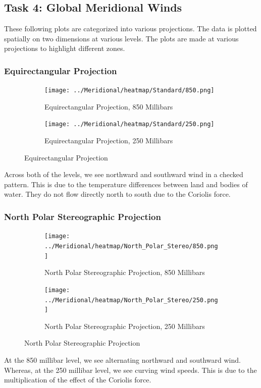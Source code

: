 \documentclass[hidelinks]{article}
\begin{document}
\subsection{Task 4: Global Meridional Winds}
These following plots are categorized into various projections. The data is plotted spatially on two dimensions at various levels.
The plots are made at various projections to highlight different zones.
\subsubsection{Equirectangular Projection}
\begin{figure}[h!]
	\begin{subfigure}[b]{\linewidth}
		\centering
		\texttt{[image: ../Meridional/heatmap/Standard/850.png]}
		\caption{Equirectangular Projection, 850 Millibars}
	\end{subfigure}
	\begin{subfigure}[b]{\linewidth}
		\centering
		\texttt{[image: ../Meridional/heatmap/Standard/250.png]}
		\caption{Equirectangular Projection,  250 Millibars}
	\end{subfigure}
	\caption{Equirectangular Projection}
\end{figure}
\noindent Across both of the levels, we see northward and southward wind in a checked pattern. This is due to the temperature differences between land and bodies of water. They do not flow directly north to south due to the Coriolis force.
\subsubsection{North Polar Stereographic Projection}
\begin{figure}[h!]
	\begin{subfigure}[b]{\linewidth}
		\centering
		\texttt{[image: ../Meridional/heatmap/North\_Polar\_Stereo/850.png]}
		\caption{North Polar Stereographic Projection, 850 Millibars}
	\end{subfigure}
	\begin{subfigure}[b]{\linewidth}
		\centering
		\texttt{[image: ../Meridional/heatmap/North\_Polar\_Stereo/250.png]}
		\caption{North Polar Stereographic Projection, 250 Millibars}
	\end{subfigure}
	\caption{North Polar Stereographic Projection}
\end{figure}
\noindent At the 850 millibar level, we see alternating northward and southward wind. Whereas, at the 250 millibar level, we see curving wind speeds. This is due to the multiplication of the effect of the Coriolis force.
\end{document}
